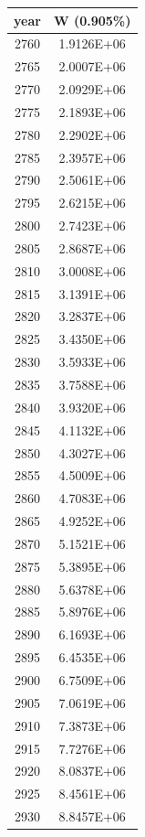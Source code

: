 \documentclass[a4paper]{article}
\begin{document}
	\begin{tabular}{|c|c|}
		\hline
		year & W (0.905\%) \\
		\hline
		2760 & 1.9126E+06 \\
		\hline
		2765 & 2.0007E+06 \\
		\hline
		2770 & 2.0929E+06 \\
		\hline
		2775 & 2.1893E+06 \\
		\hline
		2780 & 2.2902E+06 \\
		\hline
		2785 & 2.3957E+06 \\
		\hline
		2790 & 2.5061E+06 \\
		\hline
		2795 & 2.6215E+06 \\
		\hline
		2800 & 2.7423E+06 \\
		\hline
		2805 & 2.8687E+06 \\
		\hline
		2810 & 3.0008E+06 \\
		\hline
		2815 & 3.1391E+06 \\
		\hline
		2820 & 3.2837E+06 \\
		\hline
		2825 & 3.4350E+06 \\
		\hline
		2830 & 3.5933E+06 \\
		\hline
		2835 & 3.7588E+06 \\
		\hline
		2840 & 3.9320E+06 \\
		\hline
		2845 & 4.1132E+06 \\
		\hline
		2850 & 4.3027E+06 \\
		\hline
		2855 & 4.5009E+06 \\
		\hline
		2860 & 4.7083E+06 \\
		\hline
		2865 & 4.9252E+06 \\
		\hline
		2870 & 5.1521E+06 \\
		\hline
		2875 & 5.3895E+06 \\
		\hline
		2880 & 5.6378E+06 \\
		\hline
		2885 & 5.8976E+06 \\
		\hline
		2890 & 6.1693E+06 \\
		\hline
		2895 & 6.4535E+06 \\
		\hline
		2900 & 6.7509E+06 \\
		\hline
		2905 & 7.0619E+06 \\
		\hline
		2910 & 7.3873E+06 \\
		\hline
		2915 & 7.7276E+06 \\
		\hline
		2920 & 8.0837E+06 \\
		\hline
		2925 & 8.4561E+06 \\
		\hline
		2930 & 8.8457E+06 \\

\end{tabular}
\end{document}
